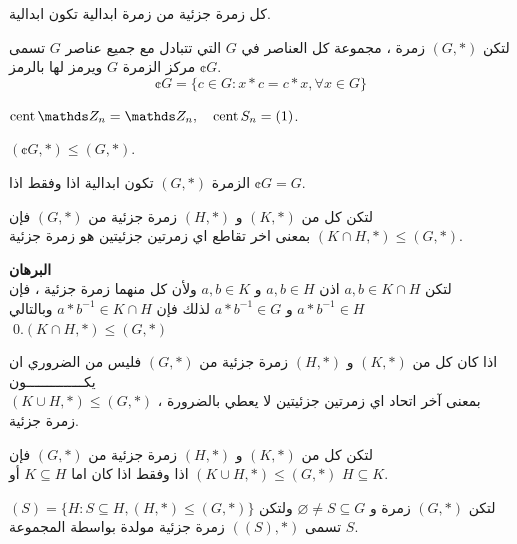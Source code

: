    \begin{note}
   	كل زمرة جزئية من زمرة ابدالية تكون ابدالية.
   \end{note}
   
   \begin{definition}
   	لتكن $(G, *)$ زمرة ، مجموعة كل العناصر في $G$ التي تتبادل مع جميع عناصر $G$ تسمى مركز الزمرة $G$ ويرمز لها بالرمز $\cent{G}$.
   	\[
   	\cent G = \{c \in G : x*c=c*x , \forall x\in G\}
   	\]
   \end{definition}
   
   \begin{example}
   	$\cent\Z_n=\Z_n, \quad \cent S_n = (1)$.
   \end{example}
   
   \begin{note}
   	$(\cent G, *) \leq (G, *)$.
   \end{note}
   
   \begin{lemma}
   	الزمرة $(G, *)$ تكون ابدالية اذا وفقط اذا $\cent G = G$.
   \end{lemma}
   
   \begin{theorem}
   	لتكن كل من $(K, *)$ و $(H, *)$ زمرة جزئية من $(G, *)$ فإن $(K \cap H, *) \leq (G, *)$ بمعنى اخر تقاطع اي زمرتين جزئيتين هو زمرة جزئية.
   \end{theorem}
\noindent
\textbf{البرهان}\\
\noindent
لتكن $a, b\in K\cap H$ اذن $a, b\in H$ و $a, b\in K$ ولأن كل منهما زمرة جزئية ، فإن 
$a*b^{-1} \in H$ و $a*b^{-1} \in G$
لذلك فإن $a*b^{-1} \in K\cap H$ وبالتالي  $(K \cap H, *) \leq (G, *)$.\qed
   \newpage
   \begin{note}
   	اذا كان كل من $(K, *)$ و $(H, *)$ زمرة جزئية من $(G, *)$  فليس من الضروري ان يكــــــــــــــون \\
   	$(K \cup H, *) \leq (G, *)$  ، بمعنى آخر اتحاد اي زمرتين جزئيتين لا يعطي بالضرورة زمرة جزئية.
   \end{note}
   
   \begin{theorem}
   	 	لتكن كل من $(K, *)$ و $(H, *)$ زمرة جزئية من $(G, *)$ فإن $(K \cup H, *) \leq (G, *)$ اذا وفقط اذا كان اما $K\subseteq H$ أو $H\subseteq K$.
   \end{theorem}
   
   \begin{definition}
   	لتكن $(G, *)$ زمرة و $\varnothing\neq S\subseteq G$ ولتكن
   	$(S) = \{H : S\subseteq H , (H, *) \leq (G, *)\}$
   	تسمى $((S), *)$ زمرة جزئية مولدة بواسطة المجموعة $S$.
   \end{definition}
   
